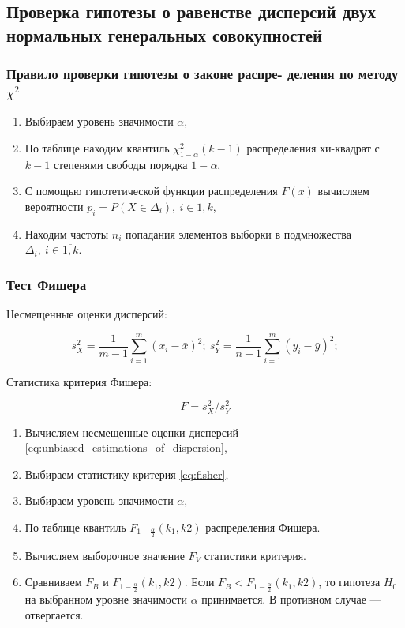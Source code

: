 \documentclass[12pt,a4paper]{article}
\begin{document}
		\subsection{Проверка гипотезы о равенстве дисперсий двух нормальных
			генеральных совокупностей}

		\subsubsection{Правило проверки гипотезы о законе распре- деления по
			методу \( \chi^2 \)}

		\begin{enumerate}
			\item Выбираем уровень значимости \( \alpha \),
			\item По таблице находим квантиль \( \chi_{1-\alpha}^2 (k - 1) \)
				распределения хи-квадрат с \( k - 1 \) степенями свободы порядка
				\( 1 - \alpha \),
			\item С помощью гипотетической функции распределения \( F(x) \)
				вычисляем вероятности
				\( p_i = P(X \in \Delta_i), \ i \in \overline{1,k} \),
			\item Находим частоты \( n_i \) попадания элементов выборки в
				подмножества \( \Delta_i, \ i \in \overline{1,k} \).
		\end{enumerate}

		\subsubsection{Тест Фишера}

		Несмещенные оценки дисперсий:

		\begin{equation} \label{eq:unbiased_estimations_of_dispersion}
			s_X^2 = \frac{1}{m - 1} \sum_{i=1}^m (x_i - \bar x)^2; \
			s_Y^2 = \frac{1}{n - 1} \sum_{i=1}^m (y_i - \bar y)^2;
		\end{equation}

		Статистика критерия Фишера:

		\begin{equation} \label{eq:fisher}
			F = s_X^2 / s_Y^2
		\end{equation}

		\begin{enumerate}
			\item Вычисляем несмещенные оценки дисперсий
				\eqref{eq:unbiased_estimations_of_dispersion},
			\item Выбираем статистику критерия \eqref{eq:fisher},
			\item Выбираем уровень значимости \( \alpha \),
			\item По таблице квантиль \( F_{1 - \frac{\alpha}{2}} (k_1, k2) \)
				распределения Фишера.
			\item Вычисляем выборочное значение \( F_V \) статистики критерия.
			\item Сравниваем \( F_B \) и \( F_{1 - \frac{\alpha}{2}} (k_1, k2) \).
				Если \( F_B < F_{1 - \frac{\alpha}{2}} (k_1, k2) \), то гипотеза
				\( H_0 \) на выбранном уровне значимости \( \alpha \) принимается.
				В противном случае — отвергается.
		\end{enumerate}
\end{document}
